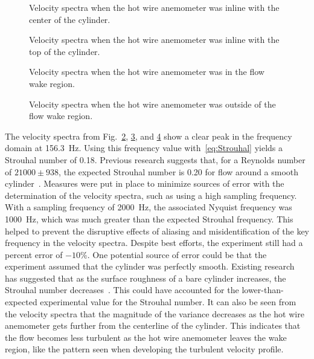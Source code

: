 \documentclass[journal,letterpaper]{IEEEtran}
\begin{document}
\begin{figure}[H]
    \centering
    
    \caption{Velocity spectra when the hot wire anemometer was inline with the center of the cylinder.}
    \label{fig:freq2}
\end{figure}
\begin{figure}[H]
    \centering
    
    \caption{Velocity spectra when the hot wire anemometer was inline with the top of the cylinder.}
    \label{fig:freq3}
\end{figure}
\vspace{0.5cm}
\begin{figure}[H]
    \centering
    
    \caption{Velocity spectra when the hot wire anemometer was in the flow wake region.}
    \label{fig:freq4}
\end{figure}
\vspace{-1.5cm}
\begin{figure}[H]
    \centering
    
    \caption{Velocity spectra when the hot wire anemometer was outside of the flow wake region.}
    \label{fig:freq5}
\end{figure}

The velocity spectra from Fig.~\ref{fig:freq3}, \ref{fig:freq4}, and \ref{fig:freq5} show a clear peak in the frequency domain at \qty{156.3}{\hertz}.
Using this frequency value with~\eqref{eq:Strouhal} yields a Strouhal number of 0.18.
Previous research suggests that, for a Reynolds number of $21000 \pm 938$, the expected Strouhal number is 0.20 for flow around a smooth cylinder~\cite{Strouhal}.
Measures were put in place to minimize sources of error with the determination of the velocity spectra, such as using a high sampling frequency.
With a sampling frequency of \qty{2000}{\hertz}, the associated Nyquist frequency was \qty{1000}{\hertz}, which was much greater than the expected Strouhal frequency.
This helped to prevent the disruptive effects of aliasing and misidentification of the key frequency in the velocity spectra.
Despite best efforts, the experiment still had a percent error of $-10$\%.
One potential source of error could be that the experiment assumed that the cylinder was perfectly smooth.
Existing research has suggested that as the surface roughness of a bare cylinder increases, the Strouhal number decreases~\cite{roughness}.
This could have accounted for the lower-than-expected experimental value for the Strouhal number.
It can also be seen from the velocity spectra that the magnitude of the variance decreases as the hot wire anemometer gets further from the centerline of the cylinder.
This indicates that the flow becomes less turbulent as the hot wire anemometer leaves the wake region, like the pattern seen when developing the turbulent velocity profile.
\end{document}
